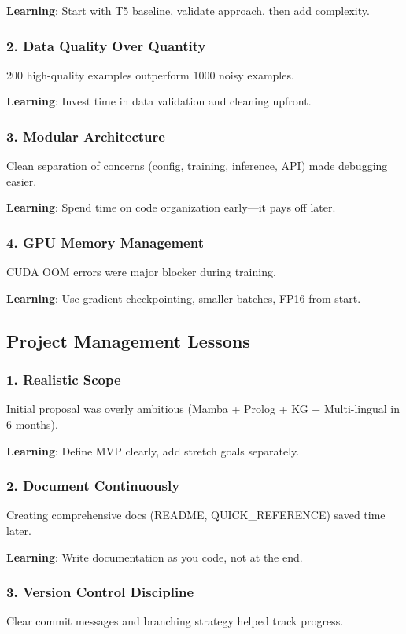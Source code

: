 \documentclass[12pt,a4paper]{article}
\begin{document}
\textbf{Learning}: Start with T5 baseline, validate approach, then add complexity.

\subsubsection{2. Data Quality Over Quantity}
200 high-quality examples outperform 1000 noisy examples.

\textbf{Learning}: Invest time in data validation and cleaning upfront.

\subsubsection{3. Modular Architecture}
Clean separation of concerns (config, training, inference, API) made debugging easier.

\textbf{Learning}: Spend time on code organization early—it pays off later.

\subsubsection{4. GPU Memory Management}
CUDA OOM errors were major blocker during training.

\textbf{Learning}: Use gradient checkpointing, smaller batches, FP16 from start.

\subsection{Project Management Lessons}

\subsubsection{1. Realistic Scope}
Initial proposal was overly ambitious (Mamba + Prolog + KG + Multi-lingual in 6 months).

\textbf{Learning}: Define MVP clearly, add stretch goals separately.

\subsubsection{2. Document Continuously}
Creating comprehensive docs (README, QUICK\_REFERENCE) saved time later.

\textbf{Learning}: Write documentation as you code, not at the end.

\subsubsection{3. Version Control Discipline}
Clear commit messages and branching strategy helped track progress.
\end{document}
